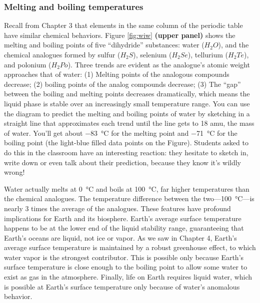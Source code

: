 \subsubsection{Melting and boiling temperatures}
Recall from Chapter 3 that elements in the same column of the periodic table have similar chemical behaviors. Figure \ref{fig:wiw} \textbf{(upper panel)} shows the melting and boiling points of five ``dihydride'' substances: water ($H_2O$), and the chemical analogues formed by sulfur ($H_2S$), selenium ($H_2Se$), tellurium ($H_2Te$), and polonium ($H_2Po$). Three trends are evident as the analogue's atomic weight approaches that of water: (1) Melting points of the analogous compounds decrease; (2) boiling points of the analog compounds decrease; (3) The ``gap'' between the boiling and melting points decreases dramatically, which means the liquid phase is stable over an increasingly small temperature range. You can use the diagram to predict the melting and boiling points of water by sketching in a straight line that approximates each trend until the line gets to 18 amu, the mass of water. You'll get about \SI{-83}{\degreeCelsius} for the melting point and \SI{-71}{\degreeCelsius} for the boiling point (the light-blue filled data points on the Figure). Students asked to do this in the classroom have an interesting reaction: they hesitate to sketch in, write down or even talk about their prediction, because they know it's wildly wrong!

Water actually melts at \SI{0}{\degreeCelsius} and boils at \SI{100}{\degreeCelsius}, far higher temperatures than the chemical analogues. The temperature difference between the two---\SI{100}{\degreeCelsius}---is nearly 3 times the average of the analogues. These features have profound implications for Earth and its biosphere. Earth's average surface temperature happens to be at the lower end of the liquid stability range, guaranteeing that Earth's oceans are liquid, not ice or vapor.  As we saw in Chapter 4, Earth's average surface temperature is maintained by a robust greenhouse effect, to which water vapor is the strongest contributor. This is possible only because Earth's surface temperature is close enough to the boiling point to allow some water to exist as gas in the atmosphere. Finally, life on Earth requires liquid water, which is possible at Earth's surface temperature only because of water's anomalous behavior.
 
